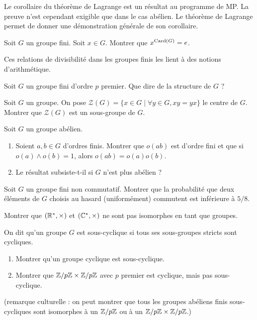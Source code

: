 \documentclass[12pt,a4paper]{exo_book}
\begin{document}
Le corollaire du théorème de Lagrange est un résultat au programme de MP. La preuve n'est cependant exigible que dans le cas abélien. Le théorème de Lagrange permet de donner une démonstration générale de son corollaire.

\begin{exo}
 Soit $G$ un groupe fini. Soit $x \in G$. Montrer que $x ^ {\operatorname{Card} (G)} = e$.
\end{exo}

Ces relations de divisibilité dans les groupes finis les lient à des notions d'arithmétique.

\begin{exo}
    Soit $G$ un groupe fini d'ordre $p$ premier. Que dire de la structure de $G$ ?
\end{exo}

\begin{exo}
    Soit $G$ un groupe. On pose $\mathcal{Z}(G) = \{x \in G \mid \forall y\in G, xy=yx\}$ le centre de $G$. Montrer que $\mathcal{Z}(G)$ est un sous-groupe de $G$.
\end{exo}

\begin{exo}
    Soit $G$ un groupe abélien.
    \begin{enumerate}
        \item Soient $a,b \in G$ d'ordres finis. Montrer que $o(ab)$ est d'ordre fini et que si $o(a) \wedge o(b) = 1$, alors $o(ab)=o(a)o(b)$.
        \item Le résultat subsiste-t-il si $G$ n'est plus abélien ?
    \end{enumerate}
\end{exo}

\begin{exo}
    Soit $G$ un groupe fini non commutatif. Montrer que la probabilité que deux éléments de $G$ choisis au hasard (uniformément) commutent est inférieure à $5/8$.
\end{exo}

\begin{exo}
    Montrer que $(\mathbb{R}^*,\times)$ et $(\mathbb{C}^*,\times)$ ne sont pas isomorphes en tant que groupes.
\end{exo}

\begin{exo}
    On dit qu'un groupe $G$ est sous-cyclique si tous ses sous-groupes stricts sont cycliques.

    \begin{enumerate}
        \item Montrer qu'un groupe cyclique est sous-cyclique.
        \item Montrer que $\mathbb{Z}/p\mathbb{Z} \times \mathbb{Z}/p\mathbb{Z}$ avec $p$ premier est cyclique, mais pas sous-cyclique.
    \end{enumerate}
    (remarque culturelle : on peut montrer que tous les groupes abéliens finis sous-cycliques sont isomorphes à un $\mathbb{Z}/p\mathbb{Z}$ ou à un $\mathbb{Z}/p\mathbb{Z} \times \mathbb{Z}/p\mathbb{Z}$.)
\end{exo}
\end{document}
